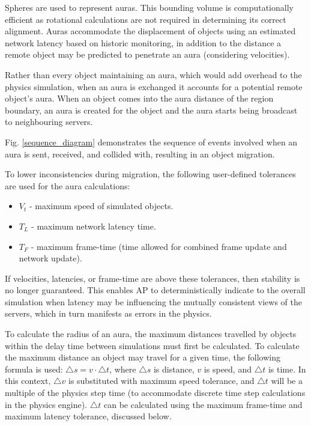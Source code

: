 Spheres are used to represent auras. This bounding volume is computationally efficient as rotational calculations are not required in determining its correct alignment. Auras accommodate the displacement of objects using an estimated network latency based on historic monitoring, in addition to the distance a remote object may be predicted to penetrate an aura (considering velocities).

Rather than every object maintaining an aura, which would add overhead to the physics simulation, when an aura is exchanged it accounts for a potential remote object's aura. When an object comes into the aura distance of the region boundary, an aura is created for the object and the aura starts being broadcast to neighbouring servers.

Fig. \ref{sequence_diagram} demonstrates the sequence of events involved when an aura is sent, received, and collided with, resulting in an object migration.

To lower inconsistencies during migration, the following user-defined tolerances are used for the aura calculations: 
\begin{itemize}
	\item $V_{t}$ - maximum speed of simulated objects.
	\item $T_{L}$ - maximum network latency time.
	\item $T_{F}$ - maximum frame-time (time allowed for combined frame update and network update).
\end{itemize}
If velocities, latencies, or frame-time are above these tolerances, then stability is no longer guaranteed. This enables AP to deterministically indicate to the overall simulation when latency may be influencing the mutually consistent views of the servers, which in turn manifests as errors in the physics.

To calculate the radius of an aura, the maximum distances travelled by objects within the delay time between simulations must first be calculated. To calculate the maximum distance an object may travel for a given time, the following formula is used: $\triangle s=v\cdot \triangle t$, where $ \triangle s$ is distance, $v$ is speed, and $ \triangle t$ is time. In this context, $ \triangle v$ is substituted with maximum speed tolerance, and $ \triangle t$ will be a multiple of the physics step time (to accommodate discrete time step calculations in the physics engine). $ \triangle t$ can be calculated using the maximum frame-time and maximum latency tolerance, discussed below.

